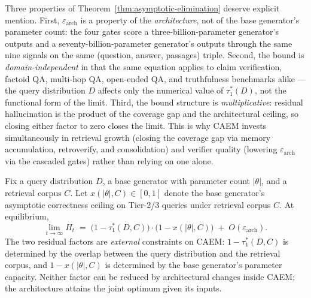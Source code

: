 Three properties of Theorem~\ref{thm:asymptotic-elimination} deserve explicit mention. First, $\varepsilon_{\text{arch}}$ is a property of the \emph{architecture}, not of the base generator's parameter count: the four gates score a three-billion-parameter generator's outputs and a seventy-billion-parameter generator's outputs through the same nine signals on the same (question, answer, passages) triple. Second, the bound is \emph{domain-independent} in that the same equation applies to claim verification, factoid QA, multi-hop QA, open-ended QA, and truthfulness benchmarks alike --- the query distribution $D$ affects only the numerical value of $\tau_{1}^{*}(D)$, not the functional form of the limit. Third, the bound structure is \emph{multiplicative}: residual hallucination is the product of the coverage gap and the architectural ceiling, so closing either factor to zero closes the limit. This is why CAEM invests simultaneously in retrieval growth (closing the coverage gap via memory accumulation, retroverify, and consolidation) and verifier quality (lowering $\varepsilon_{\text{arch}}$ via the cascaded gates) rather than relying on one alone.

\begin{corollary}
\label{cor:joint-optimum}
Fix a query distribution $D$, a base generator with parameter count $|\theta|$, and a retrieval corpus $C$. Let $x(|\theta|, C) \in [0, 1]$ denote the base generator's asymptotic correctness ceiling on Tier-2/3 queries under retrieval corpus $C$. At equilibrium,
\begin{equation}
\lim_{t \to \infty} H_{t} \;=\; \bigl(1 - \tau_{1}^{*}(D, C)\bigr) \cdot \bigl(1 - x(|\theta|, C)\bigr) \;+\; O(\varepsilon_{\text{arch}}).
\label{eq:joint-optimum}
\end{equation}
The two residual factors are \emph{external} constraints on CAEM: $1 - \tau_{1}^{*}(D, C)$ is determined by the overlap between the query distribution and the retrieval corpus, and $1 - x(|\theta|, C)$ is determined by the base generator's parameter capacity. Neither factor can be reduced by architectural changes inside CAEM; the architecture attains the joint optimum given its inputs.
\end{corollary}

